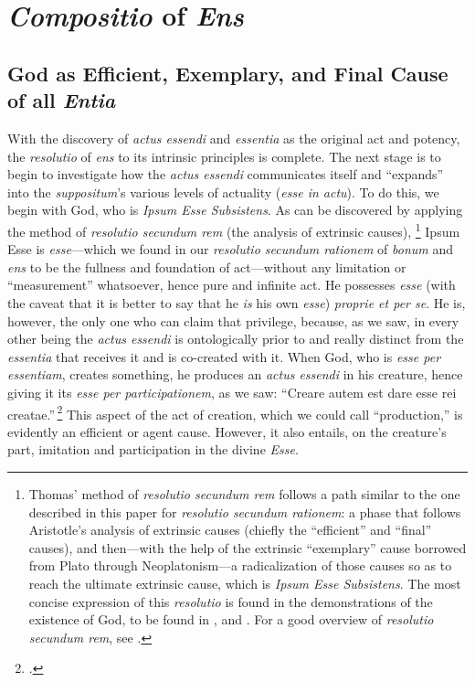 \section{\emph{Compositio} of \emph{Ens}}

\subsection{God as Efficient, Exemplary, and Final Cause of all \emph{Entia}}

With the discovery of \emph{actus essendi} and \emph{essentia} as the original act and potency, the \emph{resolutio} of \emph{ens} to its intrinsic principles is complete. The next stage is to begin to investigate how the \emph{actus essendi} communicates itself and ``expands'' into the \emph{suppositum}'s various levels of actuality (\emph{esse in actu}). To do this, we begin with God, who is \emph{Ipsum Esse Subsistens}. As can be discovered by applying the method of \emph{resolutio secundum rem} (the analysis of extrinsic causes),%
%
\footnote{Thomas' method of \emph{resolutio secundum rem} follows a path similar to the one described in this paper for \emph{resolutio secundum rationem}: a phase that follows Aristotle's analysis of extrinsic causes (chiefly the ``efficient'' and ``final'' causes), and then---with the help of the extrinsic ``exemplary'' cause borrowed from Plato through Neoplatonism---a radicalization of those causes so as to reach the ultimate extrinsic cause, which is \emph{Ipsum Esse Subsistens}. The most concise expression of this \emph{resolutio} is found in the demonstrations of the existence of God, to be found in \cite[I, q.~2, a.~3]{st:summa}, and \cite[I, cap.~13]{st:contragent}. For a good overview of \emph{resolutio secundum rem}, see \cite{mitchell:resolutio-secundum-rem}.}
%
Ipsum Esse is \emph{esse}---which we found in our \emph{resolutio secundum rationem} of \emph{bonum} and \emph{ens} to be the fullness and foundation of act---without any limitation or ``measurement'' whatsoever, hence pure and infinite act. He possesses \emph{esse} (with the caveat that it is better to say that he \emph{is} his own \emph{esse}) \emph{proprie et per se}. He is, however, the only one who can claim that privilege, because, as we saw, in every other being the \emph{actus essendi} is ontologically prior to and really distinct from the \emph{essentia} that receives it and is co-created with it. When God, who is \emph{esse per essentiam}, creates something, he produces an \emph{actus essendi} in his creature, hence giving it its \emph{esse per participationem}, as we saw: ``Creare autem est dare esse rei creatae.''\,\footcite[cap.~1, lc.~5, n.~133]{st:superio} This aspect of the act of creation, which we could call ``production,'' is evidently an efficient or agent cause. However, it also entails, on the creature's part, imitation and participation in the divine \emph{Esse}.

